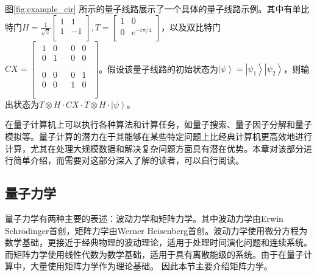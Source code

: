 图\ref{fig:example_cir} 所示的量子线路展示了一个具体的量子线路示例。其中有单比特门\(H=\frac{1}{\sqrt2}\left[\begin{matrix}1&1\\1&-1\\\end{matrix}\right],T=\left[\begin{matrix}1&0\\0&e^{-i\pi/4}\\\end{matrix}\right]\)，以及双比特门\(CX=\left[\begin{matrix}\begin{matrix}1&0\\0&1\\\end{matrix}&\begin{matrix}0&0\\0&0\\\end{matrix}\\\begin{matrix}0&0\\0&0\\\end{matrix}&\begin{matrix}0&1\\1&0\\\end{matrix}\\\end{matrix}\right]\)。假设该量子线路的初始状态为\(\left|\psi\right\rangle=\left|\psi_1\right\rangle\left|\psi_2\right\rangle\)，则输出状态为\(T\otimes H\cdot CX\cdot T\otimes H\cdot\left|\psi\right\rangle\)。

在量子计算机上可以执行各种算法和计算任务，如量子搜索\citep{Grover_1996}、量子因子分解\citep{Shor}和量子模拟\citep{Feynman}等。量子计算的潜力在于其能够在某些特定问题上比经典计算机更高效地进行计算，尤其在处理大规模数据和解决复杂问题方面具有潜在优势。本章对该部分进行简单介绍，而需要对这部分深入了解的读者，可以自行阅读\citep{nielsen2010quantum}。

\subsection{量子力学}
量子力学有两种主要的表述：波动力学和矩阵力学。其中波动力学由Erwin Schrödinger首创，矩阵力学由Werner Heisenberg首创。波动力学使用微分方程为数学基础，更接近于经典物理的波动理论，适用于处理时间演化问题和连续系统。
而矩阵力学使用线性代数为数学基础，适用于具有离散能级的系统。由于在量子计算中，大量使用矩阵力学作为理论基础。
因此本节主要介绍矩阵力学。


